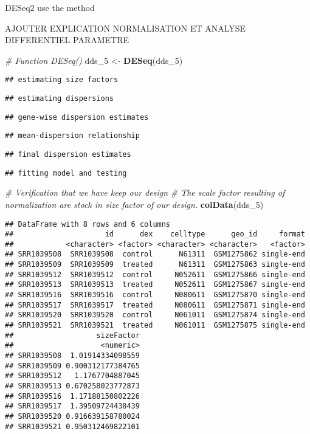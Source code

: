 \documentclass[]{article}
\newenvironment{Shaded}{\begin{snugshade}}{\end{snugshade}}
\newcommand{\KeywordTok}[1]{\textcolor[rgb]{0.13,0.29,0.53}{\textbf{#1}}}
\newcommand{\DecValTok}[1]{\textcolor[rgb]{0.00,0.00,0.81}{#1}}
\newcommand{\StringTok}[1]{\textcolor[rgb]{0.31,0.60,0.02}{#1}}
\newcommand{\CommentTok}[1]{\textcolor[rgb]{0.56,0.35,0.01}{\textit{#1}}}
\newcommand{\NormalTok}[1]{#1}
\begin{document}
DESeq2 use the method

AJOUTER EXPLICATION NORMALISATION ET ANALYSE DIFFERENTIEL PARAMETRE

\begin{Shaded}
\begin{Highlighting}[]
\CommentTok{# Function DESeq()}
\NormalTok{dds_}\DecValTok{5}\NormalTok{ <-}\StringTok{ }\KeywordTok{DESeq}\NormalTok{(dds_}\DecValTok{5}\NormalTok{)}
\end{Highlighting}
\end{Shaded}

\begin{verbatim}
## estimating size factors
\end{verbatim}

\begin{verbatim}
## estimating dispersions
\end{verbatim}

\begin{verbatim}
## gene-wise dispersion estimates
\end{verbatim}

\begin{verbatim}
## mean-dispersion relationship
\end{verbatim}

\begin{verbatim}
## final dispersion estimates
\end{verbatim}

\begin{verbatim}
## fitting model and testing
\end{verbatim}

\begin{Shaded}
\begin{Highlighting}[]
\CommentTok{# Verification that we have keep our design}
\CommentTok{# The scale factor resulting of normalization are stock in size factor of our design.}
\KeywordTok{colData}\NormalTok{(dds_}\DecValTok{5}\NormalTok{)}
\end{Highlighting}
\end{Shaded}

\begin{verbatim}
## DataFrame with 8 rows and 6 columns
##                     id      dex    celltype      geo_id     format
##            <character> <factor> <character> <character>   <factor>
## SRR1039508  SRR1039508  control      N61311  GSM1275862 single-end
## SRR1039509  SRR1039509  treated      N61311  GSM1275863 single-end
## SRR1039512  SRR1039512  control     N052611  GSM1275866 single-end
## SRR1039513  SRR1039513  treated     N052611  GSM1275867 single-end
## SRR1039516  SRR1039516  control     N080611  GSM1275870 single-end
## SRR1039517  SRR1039517  treated     N080611  GSM1275871 single-end
## SRR1039520  SRR1039520  control     N061011  GSM1275874 single-end
## SRR1039521  SRR1039521  treated     N061011  GSM1275875 single-end
##                   sizeFactor
##                    <numeric>
## SRR1039508  1.01914334098559
## SRR1039509 0.900312177384765
## SRR1039512   1.1767704887045
## SRR1039513 0.670258023772873
## SRR1039516  1.17188150802226
## SRR1039517  1.39509724438439
## SRR1039520 0.916639158780024
## SRR1039521 0.950312469822101
\end{verbatim}
\end{document}
